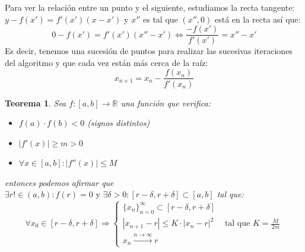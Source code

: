 \documentclass[10pt,a4paper,openright]{book}
\theoremstyle{break}
\newtheorem{theo}{Teorema}[chapter]
\begin{document}
Para ver la relación entre un punto y el siguiente, estudiamos la recta tangente: $y-f(x')=f'(x')(x-x')$ y $x''$ es tal que $(x'', 0)$ está en la recta así que:
$$0-f(x')=f'(x')(x''-x')\Leftrightarrow \frac{-f(x')}{f'(x')}=x''-x'$$
Es decir, tenemos una sucesión de puntos para realizar las sucesivas iteraciones del algoritmo y que cada vez están más cerca de la raíz:
$$x_{n+1}=x_n-\frac{f(x_n)}{f'(x_n)}$$

\begin{theo}
Sea $f: [a,b]\rightarrow \mathbb R$ una función que verifica:
\begin{itemize}
\item $f(a)\cdot f(b)<0$ (signos distintos)
\item $|f'(x)|\geq m>0$
\item $\forall x\in [a,b]: |f''(x)|\leq M$
\end{itemize}
entonces podemos afirmar que $\exists r!\in (a,b):f(r)=0\mbox{ y } \exists \delta > 0 : [r-\delta, r+\delta]\subset [a,b]$ tal que:
$$\forall x_0\in [r-\delta, r+\delta]\Rightarrow \begin{cases}\{x_n\}_{n=0}^\infty \subset [r-\delta, r+\delta] \\ |x_{n+1}-r|\leq K\cdot |x_n-r|^2 &\mbox{ tal que } K=\frac{M}{2m} \\ x_n\xrightarrow{n\rightarrow \infty}r \end{cases}$$
\end{theo}
\end{document}
